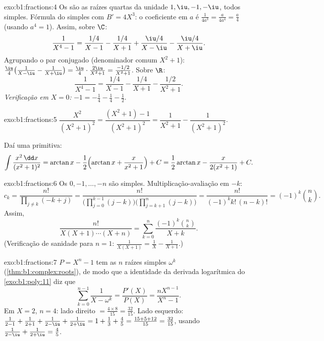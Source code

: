 \begin{solution}{exo:b1:fractions:4}
Os  são as raízes quartas da unidade $1, \iu, -1, -\iu$, todos
simples. Fórmula do  simples com $B' = 4X^3$: o coeficiente em $a$ é
$\frac{1}{4a^3} = \frac{a}{4a^4} = \frac a4$ (usando $a^4 = 1$). Assim,
sobre $\C$:
\[
\frac{1}{X^4 - 1}
= \frac{1/4}{X - 1} - \frac{1/4}{X + 1}
+ \frac{\iu/4}{X - \iu} - \frac{\iu/4}{X + \iu} .
\]
Agrupando o par conjugado (denominador comum $X^2 + 1$):
$\frac{\iu}{4}\bigl(\frac{1}{X-\iu} - \frac{1}{X+\iu}\bigr) =
\frac{\iu}{4}\cdot\frac{2\iu}{X^2+1} = \frac{-1/2}{X^2+1}$. Sobre
$\R$:
\[
\frac{1}{X^4 - 1}
= \frac{1/4}{X-1} - \frac{1/4}{X+1} - \frac{1/2}{X^2 + 1} .
\]
\emph{Verificação em $X = 0$:} $-1 = -\frac14 - \frac14 - \frac12$.
\end{solution}

\begin{solution}{exo:b1:fractions:5}
$\dfrac{X^2}{(X^2+1)^2} = \dfrac{(X^2 + 1) - 1}{(X^2+1)^2} =
\dfrac{1}{X^2+1} - \dfrac{1}{(X^2+1)^2}$.

Daí uma primitiva:
\[
\int \frac{x^2\,\dd x}{(x^2+1)^2}
= \arctan x - \frac12\Bigl(\arctan x + \frac{x}{x^2+1}\Bigr) + C
= \frac12\arctan x - \frac{x}{2(x^2+1)} + C .
\]
\end{solution}

\begin{solution}{exo:b1:fractions:6}
Os  $0, -1, \dots, -n$ são simples. Multiplicação-avaliação em $-k$:
\[
c_k = \frac{n!}{\prod_{j \neq k} (-k + j)}
= \frac{n!}{\bigl(\prod_{j=0}^{k-1}(j - k)\bigr)
\bigl(\prod_{j=k+1}^{n}(j-k)\bigr)}
= \frac{n!}{(-1)^k k!\,(n-k)!} = (-1)^k \binom nk .
\]
Assim,
\[
\frac{n!}{X(X+1)\cdots(X+n)}
= \sum_{k=0}^{n} \frac{(-1)^k \binom nk}{X + k} .
\]
(Verificação de sanidade para $n = 1$: $\frac{1}{X(X+1)} = \frac1X -
\frac{1}{X+1}$.)
\end{solution}

\begin{solution}{exo:b1:fractions:7}
$P = X^n - 1$ tem as $n$ raízes simples $\omega^k$
(\cref{thm:b1:complex:roots}), de modo que a identidade da derivada logarítmica
do \cref{exo:b1:poly:11} diz que
\[
\sum_{k=0}^{n-1} \frac{1}{X - \omega^k}
= \frac{P'(X)}{P(X)} = \frac{n X^{n-1}}{X^n - 1} .
\]
Em $X = 2$, $n = 4$: lado direito $= \frac{4 \times 8}{15} =
\frac{32}{15}$. Lado esquerdo: $\frac{1}{2-1} + \frac{1}{2+1} +
\frac{1}{2 - \iu} + \frac{1}{2 + \iu} = 1 + \frac13 + \frac{4}{5} =
\frac{15 + 5 + 12}{15} = \frac{32}{15}$, usando $\frac{1}{2-\iu} +
\frac{1}{2+\iu} = \frac{4}{5}$.
\end{solution}

